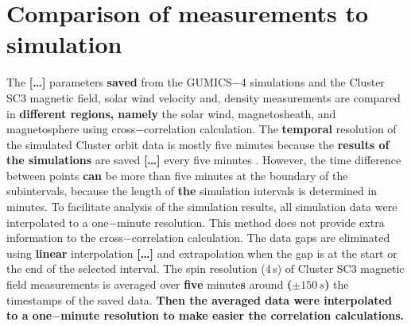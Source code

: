 \documentclass[linenumbers,draft]{agujournal}
\begin{document}
\section{Comparison of measurements to simulation}
\label{sec:comp}

The \textbf{[\dots]} parameters \textbf{saved} from the GUMICS$-$4 simulations and the Cluster SC3 magnetic field, solar wind velocity and, density measurements are compared in \textbf{different regions, namely} the solar wind, magnetosheath, and magnetosphere using cross$-$correlation calculation. The \textbf{temporal} resolution of the simulated Cluster orbit data is mostly five minutes because the \textbf{results of the simulations} are saved \textbf{[\dots]} every five minutes \citep{facsko16:_one_earth}. However, the time difference between points \textbf{can} be more than five minutes at the boundary of the subintervals, because the length of \textbf{the} simulation intervals is determined in minutes. To facilitate analysis of the simulation results, all simulation data were interpolated to a one$-$minute resolution. This method does not provide extra information to the cross$-$correlation calculation. The data gaps are eliminated using \textbf{linear} interpolation \textbf{[\dots]} and extrapolation when the gap is at the start or the end of the selected interval. The spin resolution (4\,s) of Cluster SC3 magnetic field measurements is averaged over \textbf{five} minute\textbf{s} around \textbf{($\pm150\,s$)} the timestamps of the saved data. \textbf{Then the averaged data were interpolated to a one$-$minute resolution to make easier the correlation calculations.}
\end{document}
